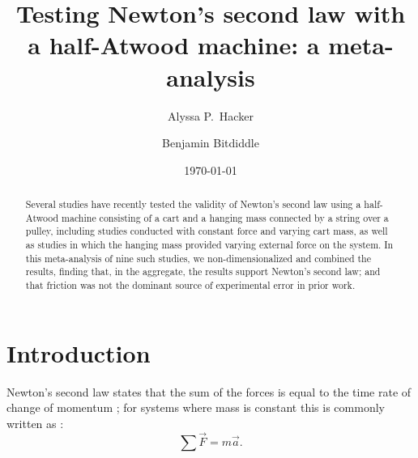 \documentclass[reprint,amsmath,amssymb,aps,twoside]{revtex4-2}
\begin{document}
\setcounter{page}{1}
\title{Testing Newton's second law with a half-Atwood machine: a meta-analysis}

\author{Alyssa P.~Hacker}
\author{Benjamin Bitdiddle}
\date{\today}

\begin{abstract}
Several studies have recently tested the validity of Newton's second law using a half-Atwood machine consisting of a cart and a hanging mass connected by a string over a pulley, including studies conducted with constant force and varying cart mass, as well as studies in which the hanging mass provided varying external force on the system. In this meta-analysis of nine such studies, we non-dimensionalized and combined the results, finding that, in the aggregate, the results support Newton's second law; and that friction was not the dominant source of experimental error in prior work. 
\end{abstract}


\maketitle\thispagestyle{mytitlepage}





\section{Introduction}
Newton's second law states that the sum of the forces is equal to the time rate of change of momentum \cite{newton1687principia}; for systems where mass is constant this is commonly written as \cite{tipler, barrons}:
\begin{equation}
\sum\vec{F} = m\vec{a}.
\label{eq:n2l}
\end{equation}
\end{document}
